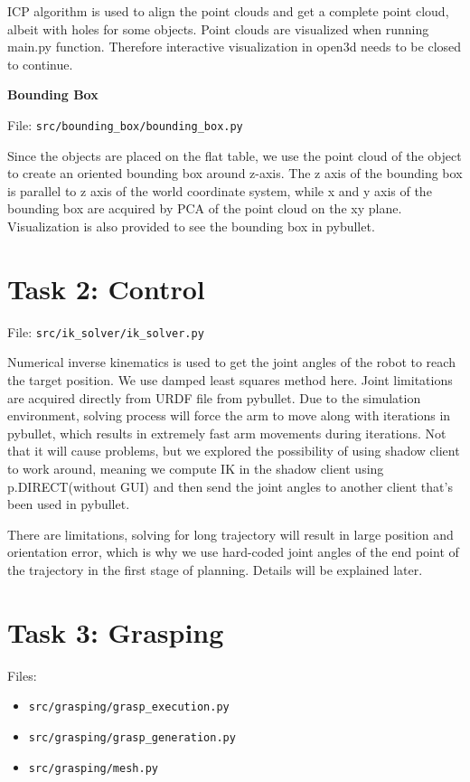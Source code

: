 \documentclass[
	english,
	accentcolor=11d,%
	type=intern,
	marginpar=false,
    logofile=media/PEARLTUDA.png
	]{tudapub}
\let\code\texttt
\begin{document}
ICP algorithm is used to align the point clouds and get a complete point cloud, albeit with holes for some objects. Point clouds are visualized when running main.py function. Therefore interactive visualization in open3d needs to be closed to continue.

\vspace{0.5cm}
\noindent\textbf{Bounding Box}

\noindent File: \code{src/bounding\_box/bounding\_box.py}

Since the objects are placed on the flat table, we use the point cloud of the object to create an oriented bounding box around z-axis. The z axis of the bounding box is parallel to z axis of the world coordinate system, while x and y axis of the bounding box are acquired by PCA of the point cloud on the xy plane. Visualization is also provided to see the bounding box in pybullet.

\section{Task 2: Control}
\noindent File: \code{src/ik\_solver/ik\_solver.py}

Numerical inverse kinematics is used to get the joint angles of the robot to reach the target position. We use damped least squares method here. Joint limitations are acquired directly from URDF file from pybullet. Due to the simulation environment, solving process will force the arm to move along with iterations in pybullet, which results in extremely fast arm movements during iterations. Not that it will cause problems, but we explored the possibility of using shadow client to work around, meaning we compute IK in the shadow client using p.DIRECT(without GUI) and then send the joint angles to another client that's been used in pybullet.

There are limitations, solving for long trajectory will result in large position and orientation error, which is why we use hard-coded joint angles of the end point of the trajectory in the first stage of planning. Details will be explained later.

\section{Task 3: Grasping}
Files: 
\begin{itemize}
\item \code{src/grasping/grasp\_execution.py}
\item \code{src/grasping/grasp\_generation.py}
\item \code{src/grasping/mesh.py}
\end{itemize}
\end{document}
